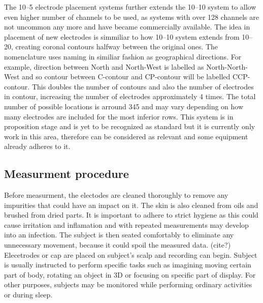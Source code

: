 The 10--5 electrode placement systems further extends the 10--10 system to allow
even higher number of channels to be used, as systems with over 128 channels are
not uncommon any more and have became commercially available. The idea in
placement of new electrodes is simmiliar to how 10--10 system extends from
10--20, creating coronal contours halfway between the original ones. The
nomenclature uses naming in similiar fashion as geographical directions. For
example, direction between North and North-West is labelled as North-North-West
and so contour between C-contour and CP-contour will be labelled CCP-contour.
This doubles the number of contours and also the number of electrodes in
contour, increasing the number of electrodes approximately 4 times. The total
number of possible locations is arround 345 and may vary depending on how many
electrodes are included for the most inferior rows. \cite{placeSys} This system is
in proposition stage and is yet to be recognized as standard but it is currently
only work in this area, therefore can be considered as relevant and some
equipment already adheres to it.

\subsection{Measurment procedure}
Before measurment, the electodes are cleaned thoroughly to remove any impurities
that could have an impact on it. The skin is also cleaned from oils and brushed
from dried parts. It is important to adhere to strict hygiene as this could
cause irritation and inflamation and with repeated measurements may develop into
an infection.\cite{eegFund} The subject is then seated comfortably to eliminate
any unnecessary movement, because it could spoil the measured data. (cite?)
Elecetrodes  or cap are placed on subject's scalp and recording can begin.
Subject is usually instructed to perform specific tasks such as imagining moving
certain part of body, rotating an object in 3D or focusing on specific part of
display. \cite{bcComm} For other purposes, subjects may be monitored while
performing ordinary activities or during sleep.

